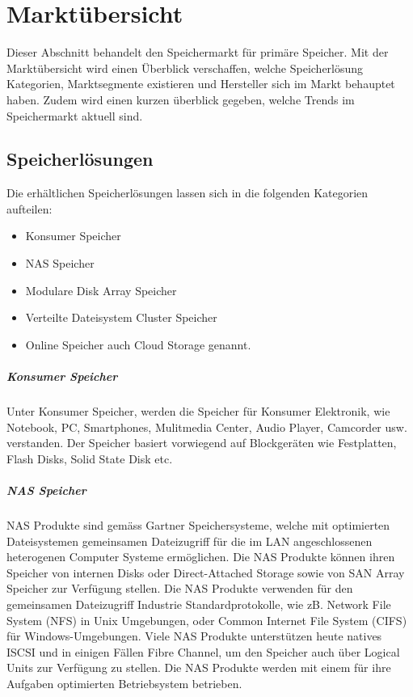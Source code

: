 \cleardoublepage
\chapter{Marktübersicht}

Dieser Abschnitt behandelt den Speichermarkt für primäre Speicher. Mit der Marktübersicht wird einen Überblick verschaffen, welche Speicherlösung Kategorien, Marktsegmente existieren und Hersteller sich im Markt behauptet haben. Zudem wird einen kurzen überblick gegeben, welche Trends im Speichermarkt aktuell sind.

\section{Speicherlösungen}
Die erhältlichen Speicherlösungen lassen sich in die folgenden Kategorien aufteilen: 
\begin{itemize}
\item Konsumer Speicher
\item NAS Speicher
\item Modulare Disk Array Speicher
\item Verteilte Dateisystem Cluster Speicher 
\item Online Speicher auch Cloud Storage genannt.
\end{itemize}

\paragraph*{Konsumer Speicher}
Unter Konsumer Speicher, werden die Speicher für Konsumer Elektronik, wie Notebook, PC, Smartphones, Mulitmedia Center, Audio Player, Camcorder usw. verstanden. Der Speicher basiert vorwiegend auf Blockgeräten wie Festplatten, Flash Disks, Solid State Disk etc.

\paragraph*{NAS Speicher}
NAS Produkte sind gemäss Gartner Speichersysteme, welche mit optimierten Dateisystemen gemeinsamen Dateizugriff für die im LAN angeschlossenen heterogenen Computer Systeme ermöglichen. Die NAS Produkte können ihren Speicher von internen Disks oder Direct-Attached Storage sowie von SAN Array Speicher zur Verfügung stellen. Die NAS Produkte verwenden für den gemeinsamen Dateizugriff Industrie Standardprotokolle, wie zB. Network File System (NFS) in Unix Umgebungen, oder Common Internet File System (CIFS) für Windows-Umgebungen. 
Viele NAS Produkte unterstützen heute natives ISCSI und in einigen Fällen Fibre Channel, um den Speicher auch über Logical Units zur Verfügung zu stellen. Die NAS Produkte werden mit einem für ihre Aufgaben optimierten Betriebsystem betrieben. \cite{RogerW.CoxPushanRinnenStanleyZaffos2011}

